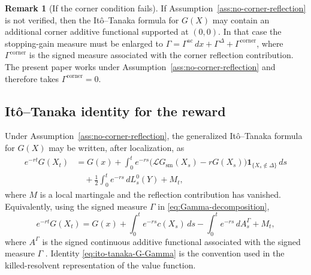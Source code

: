 \documentclass[pdflatex,sn-mathphys-num]{sn-jnl}
\theoremstyle{plain}
\theoremstyle{definition}
\newtheorem{remark}[theorem]{Remark}
\begin{document}
\begin{remark}[If the corner condition fails]
\label{rem:corner-measure-warning}
If Assumption~\ref{ass:no-corner-reflection} is not verified, then the
It\^o--Tanaka formula for $G(X)$ may contain an additional corner additive
functional supported at $(0,0)$. In that case the stopping-gain measure must be
enlarged to
$\Gamma=\Gamma^{\mathrm{ac}}\,dx+\Gamma^\Delta+\Gamma^{\mathrm{corner}}$,
where $\Gamma^{\mathrm{corner}}$ is the signed measure associated with the
corner reflection contribution. The present paper works under
Assumption~\ref{ass:no-corner-reflection} and therefore takes
$\Gamma^{\mathrm{corner}}=0$.
\end{remark}

\subsection{It\^o--Tanaka identity for the reward}
\label{sec:ito-tanaka-G-final}
Under Assumption~\ref{ass:no-corner-reflection}, the generalized It\^o--Tanaka
formula for $G(X)$ may be written, after localization, as
\begin{equation*}
\begin{aligned}
   e^{-rt}G(X_t)
   &=
   G(x)
   +\int_0^t e^{-rs}
      \big(\mathcal L G_{\mathrm{sm}}(X_s)-rG(X_s)\big)
      \mathbf 1_{\{X_s\notin\Delta\}}\,ds
   \nonumber\\
   &\quad
   +\frac12\int_0^t e^{-rs}\,dL_s^0(Y)
   +M_t,
\end{aligned}
\end{equation*}
where $M$ is a local martingale and the reflection contribution has vanished.
Equivalently, using the signed measure $\Gamma$ in
\eqref{eq:Gamma-decomposition},
\begin{equation}
\label{eq:ito-tanaka-G-Gamma}
   e^{-rt}G(X_t)
   =
   G(x)
   +\int_0^t e^{-rs}c(X_s)\,ds
   -\int_0^t e^{-rs}\,dA_s^\Gamma
   +M_t,
\end{equation}
where $A^\Gamma$ is the signed continuous additive functional associated with
the signed measure $\Gamma$ \cite{revuz2013continuous,fukushima2011dirichlet}.
Identity \eqref{eq:ito-tanaka-G-Gamma} is the convention used in the
killed-resolvent representation of the value function.

\end{document}
